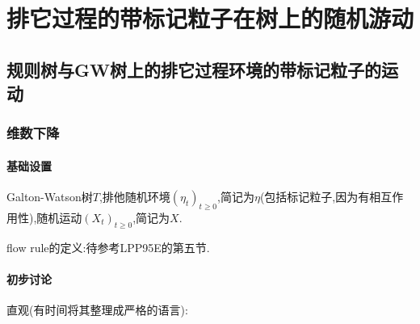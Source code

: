\chapter{排它过程的带标记粒子在树上的随机游动}

\section{规则树与GW树上的排它过程环境的带标记粒子的运动}

	


	
	\subsection{维数下降}

		\subsubsection*{基础设置}

			Galton-Watson树$T$,排他随机环境$(\eta_t)_{t \ge 0}$,简记为$\eta$(包括标记粒子,因为有相互作用性),随机运动$(X_t)_{t \ge 0}$,简记为$X$.

			flow rule的定义:待参考LPP95E的第五节.

		\subsubsection*{初步讨论}

			直观(有时间将其整理成严格的语言):

